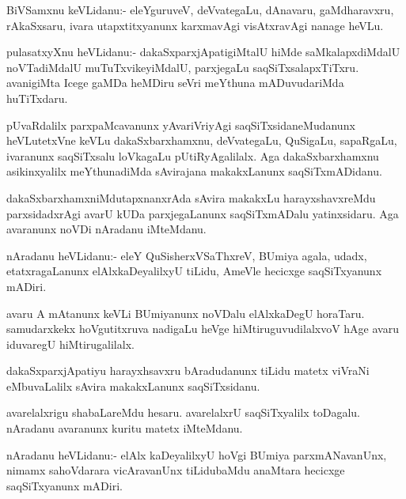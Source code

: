 \documentclass{article}
\begin{document}

\begin{mn}%
BiVSamxnu keVLidanu:- eleYguruveV, deVvategaLu, dAnavaru,
gaMdharavxru, rAkaSxsaru, ivara utapxtitxyanunx karxmavAgi
visAtxravAgi nanage heVLu.
\end{mn}

\begin{mn}
pulasatxyXnu heVLidanu:- dakaSxparxjApatigiMtalU hiMde
saMkalapxdiMdalU noVTadiMdalU muTuTxvikeyiMdalU, parxjegaLu
saqSiTxsalapxTiTxru. avanigiMta Icege gaMDa heMDiru seVri meYthuna
mADuvudariMda huTiTxdaru.
\end{mn}

\begin{mn}
pUvaRdalilx parxpaMcavanunx yAvariVriyAgi saqSiTxsidaneMudanunx
heVLutetxVne keVLu dakaSxbarxhamxnu, deVvategaLu, QuSigaLu, sapaRgaLu,
ivaranunx saqSiTxsalu loVkagaLu pUtiRyAgalilalx. Aga dakaSxbarxhamxnu
asikinxyalilx meYthunadiMda sAvirajana makakxLanunx saqSiTxmADidanu.
\end{mn}

\begin{mn}
dakaSxbarxhamxniMdutapxnanxrAda sAvira makakxLu harayxshavxreMdu
parxsidadxrAgi avarU kUDa parxjegaLanunx saqSiTxmADalu
yatinxsidaru. Aga avaranunx noVDi nAradanu iMteMdanu.
\end{mn}

\begin{mn}
nAradanu heVLidanu:- eleY QuSisherxVSaThxreV, BUmiya agala, udadx,
etatxragaLanunx elAlxkaDeyalilxyU tiLidu, AmeVle hecicxge
saqSiTxyanunx mADiri.
\end{mn}

\begin{mn}
avaru A mAtanunx keVLi BUmiyanunx noVDalu elAlxkaDegU
horaTaru. samudarxkekx hoVgutitxruva nadigaLu heVge
hiMtiruguvudilalxvoV hAge avaru iduvaregU hiMtirugalilalx.
\end{mn}

\begin{mn}
dakaSxparxjApatiyu harayxhsavxru bAradudanunx tiLidu matetx viVraNi
eMbuvaLalilx sAvira makakxLanunx saqSiTxsidanu.
\end{mn}

\begin{mn}%
avarelalxrigu shabaLareMdu hesaru. avarelalxrU saqSiTxyalilx
toDagalu. nAradanu avaranunx kuritu matetx iMteMdanu.
\end{mn}

\begin{mn}
nAradanu heVLidanu:- elAlx kaDeyalilxyU hoVgi BUmiya parxmANavanUnx,
nimamx sahoVdarara vicAravanUnx tiLidubaMdu anaMtara hecicxge
saqSiTxyanunx mADiri.
\end{mn}
\end{document}
